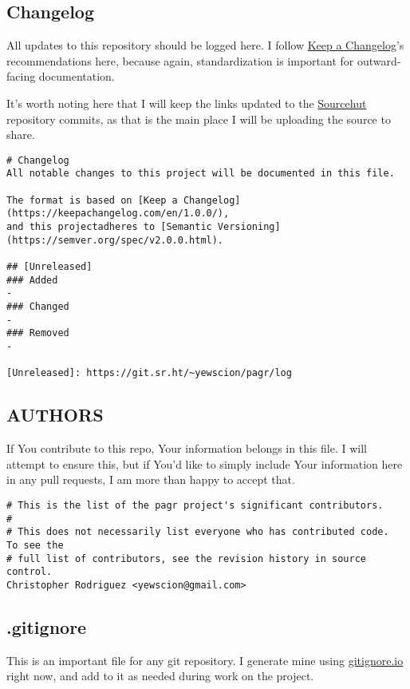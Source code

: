 \documentclass[11pt]{article}
\begin{document}
\subsection{Changelog}
\label{sec:org9e2deaf}
All updates to this repository should be logged here. I follow \href{https://keepachangelog.com/}{Keep a
Changelog}'s recommendations here, because again, standardization is important
for outward-facing documentation.

It's worth noting here that I will keep the links updated to the \href{https://sr.ht/}{Sourcehut}
repository commits, as that is the main place I will be uploading the source to
share.

\begin{verbatim}
# Changelog
All notable changes to this project will be documented in this file.

The format is based on [Keep a Changelog](https://keepachangelog.com/en/1.0.0/),
and this projectadheres to [Semantic Versioning](https://semver.org/spec/v2.0.0.html).

## [Unreleased]
### Added
-
### Changed
-
### Removed
-

[Unreleased]: https://git.sr.ht/~yewscion/pagr/log
\end{verbatim}

\subsection{AUTHORS}
\label{sec:orgd1849c8}
If You contribute to this repo, Your information belongs in this file. I will
attempt to ensure this, but if You'd like to simply include Your information
here in any pull requests, I am more than happy to accept that.

\begin{verbatim}
# This is the list of the pagr project's significant contributors.
#
# This does not necessarily list everyone who has contributed code.  To see the
# full list of contributors, see the revision history in source control.
Christopher Rodriguez <yewscion@gmail.com>
\end{verbatim}

\subsection{.gitignore}
\label{sec:org599d000}
This is an important file for any git repository. I generate mine using
\href{https://www.toptal.com/developers/gitignore}{gitignore.io} right now, and add to it as needed during work on the project.
\end{document}
